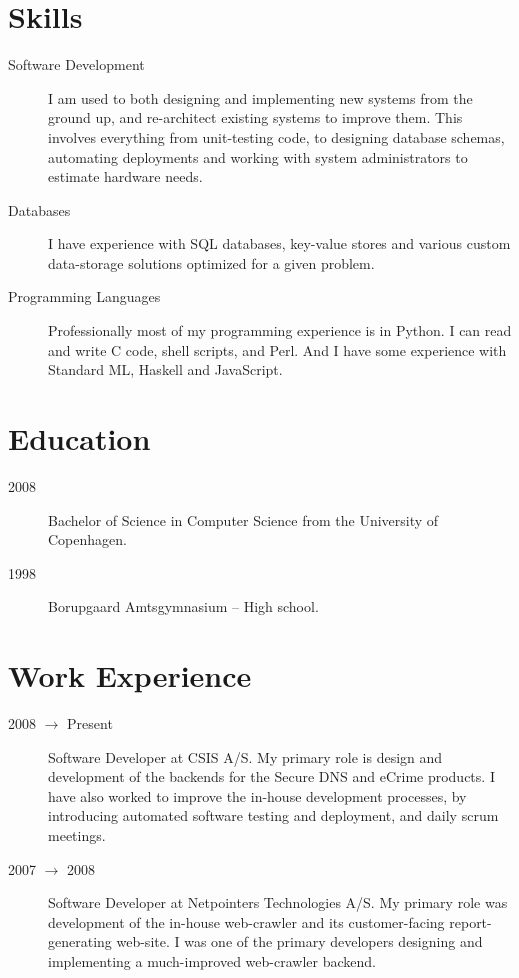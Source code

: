 \documentclass[margin,line,a4paper]{resume}
\begin{document}
\begin{resume}
\section{\mysidestyle Skills}\vspace{1mm}
\begin{description}
\item[Software Development] I am used to both designing and implementing new
systems from the ground up, and re-architect existing systems to improve them.
This involves everything from unit-testing code, to designing database
schemas, automating deployments and working with system administrators to
estimate hardware needs.
\item[Databases] I have experience with SQL databases, key-value stores and
various custom data-storage solutions optimized for a given problem.
\item[Programming Languages] Professionally most of my programming experience
is in Python. I can read and write C code, shell scripts, and Perl.  And I
have some experience with Standard ML, Haskell and JavaScript.
\end{description}

\section{\mysidestyle Education}\vspace{1mm}
\begin{description}
\item[2008] Bachelor of Science in Computer Science from
the University of Copenhagen.
\item[1998] Borupgaard Amtsgymnasium -- High school.
\end{description}

\section{\mysidestyle Work Experience}\vspace{1mm}
\begin{description}
\item[2008 $\rightarrow$ Present] Software Developer at CSIS A/S. My primary
role is design and development of the backends for the Secure DNS and eCrime
products.  I have also worked to improve the in-house development processes,
by introducing automated software testing and deployment, and daily scrum
meetings.

\item[2007 $\rightarrow$ 2008] Software Developer at Netpointers Technologies
A/S. My primary role was development of the in-house web-crawler and its
customer-facing report-generating web-site. I was one of the primary
developers designing and implementing a much-improved web-crawler backend.


\end{description}
\end{resume}
\end{document}

